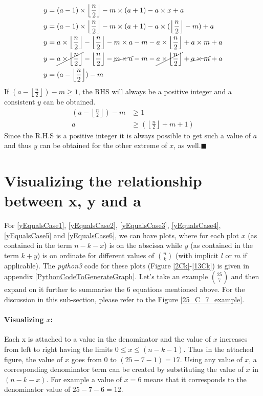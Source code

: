 \documentclass[10pt, twoside]{article}
\newcommand*{\Combination}[2]{\binom{#1}{#2}}%
\newcommand{\floordivision}[2]{\left\lfloor \frac{#1}{#2} \right\rfloor}
\begin{document}
\begin{align*}
	y &= (a-1)\times \floordivision{n}{2} -m\times(a+1) - a\times x + a \\
	y &= (a-1)\times \floordivision{n}{2} -m\times(a+1) - a\times(\floordivision{n}{2}-m) + a\\
	y &= a\times \floordivision{n}{2} -\floordivision{n}{2} -m\times a - m -a\times \floordivision{n}{2} +a\times m + a \\
	y &= \cancel{a\times \floordivision{n}{2}} -\floordivision{n}{2} -\cancel{m\times a} - m -\cancel{a\times \floordivision{n}{2}} +\cancel{a\times m} + a \\
	y &= (a - \floordivision{n}{2}) -m 
\end{align*}
If $(a - \floordivision{n}{2}) -m \geq 1$, the RHS will always be a positive integer and a consistent $y$ can be obtained.
\begin{align}
	(a - \floordivision{n}{2}) -m  &\geq 1 \nonumber \\
	a &\geq (\floordivision{n}{2}+m+1) \label{tempAforYequals6-2}
\end{align}
Since the R.H.S is a positive integer it is always possible to get such a value of $a$ and thus $y$ can be obtained for the other extreme of $x$, as well.$\blacksquare$
\section{Visualizing the relationship between x, y and a}\label{Visualization}
For \eqref{yEqualsCase1}, \eqref{yEqualsCase2}, \eqref{yEqualsCase3}, \eqref{yEqualsCase4}, \eqref{yEqualsCase5} and \eqref{yEqualsCase6}, we can have plots, where for each plot $x$ (as contained in the term $n-k-x$) is on the abscissa while $y$ (as contained in the term $k+y$) is on ordinate for different values of $\Combination{n}{k}$ (with implicit $l$ or $m$ if applicable). The \textit{python3} code for these plots (Figure \ref{2Ck}-\ref{13Ck}) is given in appendix \ref{PythonCodeToGenerateGraph}. Let's take an example $\Combination{25}{7}$ and then expand on it further to summarise the 6 equations mentioned above. For the discussion in this sub-section, please refer to the Figure \ref{25_C_7_example}. 
\paragraph{Visualizing $x$:}Each x is attached to a value in the denominator and the value of $x$ increases from left to right having the limits $0 \leq x \leq (n-k-1)$. Thus in the attached figure, the value of $x$ goes from $0$ to $(25-7-1)=17$. Using any value of $x$, a corresponding denominator term can be created by substituting the value of $x$ in $(n-k-x)$. For example a value of $x=6$ means that it corresponds to the denominator value of $25-7-6=12$.
\end{document}
